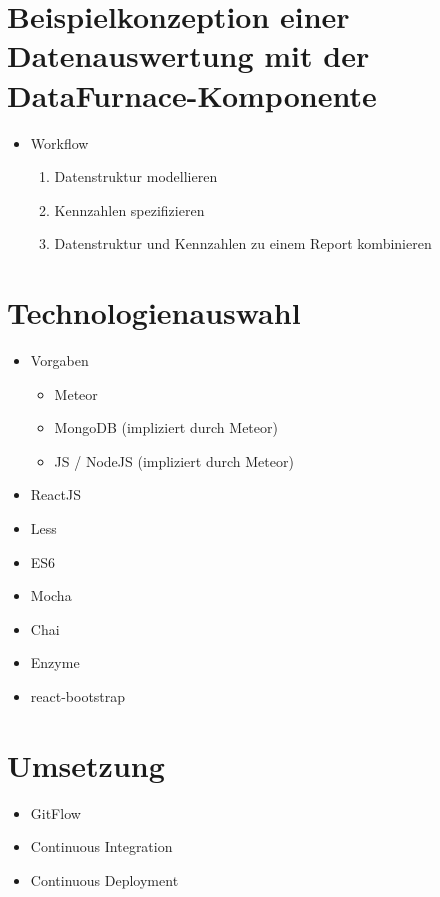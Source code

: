 \documentclass[
  language=german, %
  type=bachelor%
]{isthesis}
\begin{document}
\begin{content}
  \section{Beispielkonzeption einer Datenauswertung mit der DataFurnace-Komponente}
  \begin{itemize}
    \item Workflow
      \begin{enumerate}
        \item Datenstruktur modellieren
        \item Kennzahlen spezifizieren
        \item Datenstruktur und Kennzahlen zu einem Report kombinieren
      \end{enumerate}
  \end{itemize}

  \section{Technologienauswahl}
  \begin{itemize}
    \item Vorgaben
      \begin{itemize}
        \item Meteor
        \item MongoDB (impliziert durch Meteor)
        \item JS / NodeJS (impliziert durch Meteor)
      \end{itemize}
    \item ReactJS
    \item Less
    \item ES6
    \item Mocha
    \item Chai
    \item Enzyme
    \item react-bootstrap
  \end{itemize}

  \section{Umsetzung}
  \begin{itemize}
    \item GitFlow
    \item Continuous Integration
    \item Continuous Deployment
  \end{itemize}



\end{content}
\end{document}
